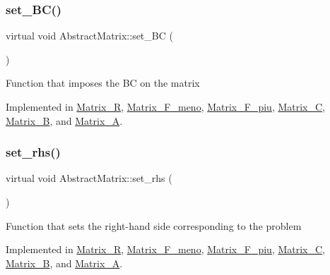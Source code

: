 \subsubsection{\texorpdfstring{set\+\_\+\+B\+C()}{set\_BC()}}
{\footnotesize\ttfamily virtual void Abstract\+Matrix\+::set\+\_\+\+BC (\begin{DoxyParamCaption}{ }\end{DoxyParamCaption})\hspace{0.3cm}{\ttfamily [pure virtual]}}

Function that imposes the BC on the matrix 

Implemented in \hyperlink{classMatrix__R_a33b829a44256d8d363891f3fc3d58244}{Matrix\+\_\+R}, \hyperlink{classMatrix__F__meno_ac8ae0448eb45d2c2996d5cfdb2a587f9}{Matrix\+\_\+\+F\+\_\+meno}, \hyperlink{classMatrix__F__piu_afa51e1c04b403a491178bbeda322ce9d}{Matrix\+\_\+\+F\+\_\+piu}, \hyperlink{classMatrix__C_a9235c2dbf2853fae4122251726a7efce}{Matrix\+\_\+C}, \hyperlink{classMatrix__B_a1a076a3ccac19b0ad436686bc8b8babd}{Matrix\+\_\+B}, and \hyperlink{classMatrix__A_aa6830348870aa5b7c6e99fb65dcb6b6e}{Matrix\+\_\+A}.

\mbox{\label{classAbstractMatrix_a1334661de25f76dc65f16538c167a03c}} 
\subsubsection{\texorpdfstring{set\+\_\+rhs()}{set\_rhs()}}
{\footnotesize\ttfamily virtual void Abstract\+Matrix\+::set\+\_\+rhs (\begin{DoxyParamCaption}{ }\end{DoxyParamCaption})\hspace{0.3cm}{\ttfamily [pure virtual]}}

Function that sets the right-\/hand side corresponding to the problem 

Implemented in \hyperlink{classMatrix__R_a6305da2e94b8841f14061f3ad1ed9464}{Matrix\+\_\+R}, \hyperlink{classMatrix__F__meno_adbe40c5bd77fc92b0db81233797276ca}{Matrix\+\_\+\+F\+\_\+meno}, \hyperlink{classMatrix__F__piu_a174bfb860e79ad913fef24202d3ce96d}{Matrix\+\_\+\+F\+\_\+piu}, \hyperlink{classMatrix__C_af305bfe533e702d629df3fb0409bc8d2}{Matrix\+\_\+C}, \hyperlink{classMatrix__B_ab4f89f8522128bd9677fd301f4f96c6e}{Matrix\+\_\+B}, and \hyperlink{classMatrix__A_a750e028c607aa3e4ac59db450aa43d2a}{Matrix\+\_\+A}.



